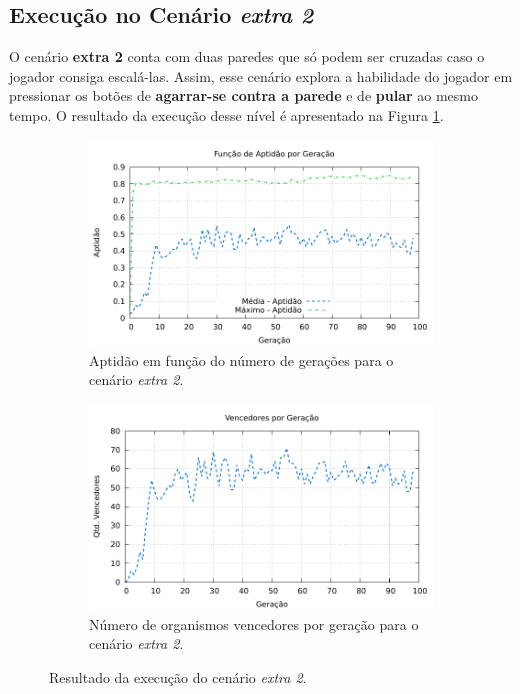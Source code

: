 
\subsection{Execução no Cenário \textit{extra 2}}

O cenário \textbf{extra 2} conta com duas paredes que só podem ser cruzadas
caso o jogador consiga escalá-las. Assim, esse cenário explora a habilidade do
jogador em pressionar os botões de \textbf{agarrar-se contra a parede} e de
\textbf{pular} ao mesmo tempo. O resultado da execução desse nível é
apresentado na Figura \ref{fig:extra2-results}.

\begin{figure}[H]
\centering
	\begin{subfigure}[b]{0.4\textwidth}
        \includegraphics[width=\textwidth]{fig/extra2-fitness.pdf}
        \caption{Aptidão em função do número de gerações para o cenário
        \textit{extra 2}.}
	\end{subfigure}
	\begin{subfigure}[b]{0.4\textwidth}
        \includegraphics[width=\textwidth]{fig/extra2-winners.pdf}
        \caption{Número de organismos vencedores por geração para o cenário
        \textit{extra 2}.}
	\end{subfigure}

    \caption{Resultado da execução do cenário \textit{extra 2}.}
	\label{fig:extra2-results}
\end{figure}

